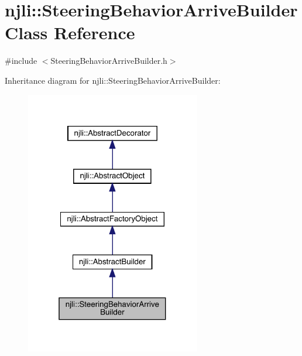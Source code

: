 \hypertarget{classnjli_1_1_steering_behavior_arrive_builder}{}\section{njli\+:\+:Steering\+Behavior\+Arrive\+Builder Class Reference}
\label{classnjli_1_1_steering_behavior_arrive_builder}


{\ttfamily \#include $<$Steering\+Behavior\+Arrive\+Builder.\+h$>$}



Inheritance diagram for njli\+:\+:Steering\+Behavior\+Arrive\+Builder\+:\nopagebreak
\begin{figure}[H]
\begin{center}
\leavevmode
\includegraphics[width=217pt]{classnjli_1_1_steering_behavior_arrive_builder__inherit__graph}
\end{center}
\end{figure}


